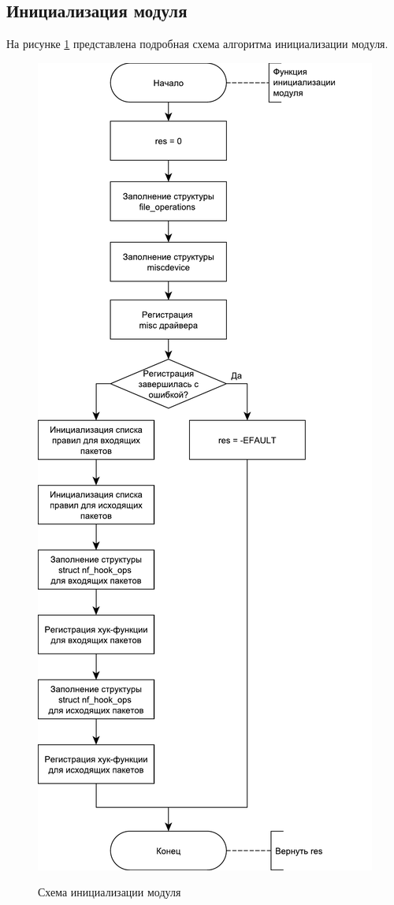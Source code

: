 \subsection{Инициализация модуля}
На рисунке \ref{fig3:image} представлена подробная схема алгоритма инициализации модуля.
\begin{figure}[p]
	\begin{center}
		{\includegraphics[scale = 0.6]{img/init.pdf}}
		\caption{Схема инициализации модуля}
		\label{fig3:image}
	\end{center}
\end{figure}


